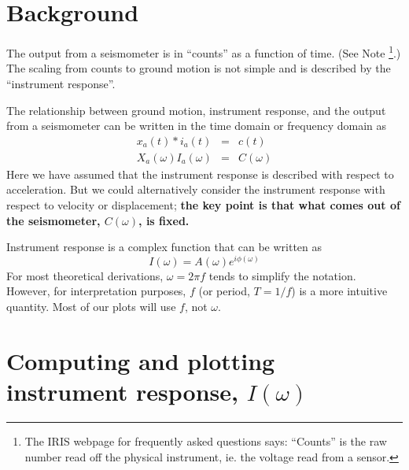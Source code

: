 \documentclass[11pt,titlepage,fleqn]{article}
\begin{document}
\pagebreak
\section{Background}

The output from a seismometer is in ``counts'' as a function of time. (See Note \footnote{The IRIS webpage for frequently asked questions says: ``Counts'' is the raw number read off the physical instrument, ie. the voltage read from a sensor.}.) The scaling from counts to ground motion is not simple and is described by the ``instrument response''.

The relationship between ground motion, instrument response, and the output from a seismometer can be written in the time domain or frequency domain as
%
\begin{eqnarray}
x_a(t) * i_a(t) &=& c(t)
\\
X_a(\omega) I_a(\omega) &=& C(\omega)
\end{eqnarray}
%
Here we have assumed that the instrument response is described with respect to acceleration. But we could alternatively consider the instrument response with respect to velocity or displacement; {\bf the key point is that what comes out of the seismometer, $C(\omega)$, is fixed.}

Instrument response is a complex function that can be written as
%
\begin{equation}
I(\omega) = A(\omega) e^{i \phi(\omega)}
\label{Iw}
\end{equation}
%
For most theoretical derivations, $\omega = 2\pi f$ tends to simplify the notation. However, for interpretation purposes, $f$ (or period, $T = 1/f$) is a more intuitive quantity. Most of our plots will use $f$, not $\omega$.


\section{Computing and plotting instrument response, $I(\omega)$}
\end{document}
